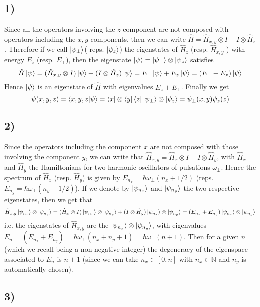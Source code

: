 \documentclass[10pt,a4paper]{book}
\begin{document}
\subsection*{1)}

Since all the operators involving the $z$-component are not composed with operators including the $x,y$-components, then we can write $\hat{H}=\hat{H}_{x,y}\otimes I+I\otimes\hat{H}_z$. Therefore if we call $\ket{\psi_{\perp}}$( reps. $\ket{\psi_z}$) the eigenstates of $\hat{H}_z$ (resp. $\hat{H}_{x,y}$ ) with energy $E_z$ (resp. $E_{\perp}$), then the eigenstate $\ket{\psi}=\ket{\psi_{\perp}}\otimes\ket{\psi_z}$ satisfies
$$\hat{H}\ket{\psi}=(\hat{H}_{x,y}\otimes I)\ket{\psi}+(I\otimes\hat{H}_z)\ket{\psi}=E_{\perp}\ket{\psi}+E_z\ket{\psi}=(E_{\perp}+E_{z})\ket{\psi}$$
Hence $\ket{\psi}$ is an eigenstate of $\hat{H}$ with eigenvalues $E_z+E_{\perp}$. 
Finally we get 
$$\psi(x,y,z)=\braket{x,y,z|\psi}=\bra{x}\otimes\bra{y}\bra{z}\ket{\psi_{\perp}}\otimes\ket{\psi_z}=\psi_{\perp}(x,y)\psi_z(z)$$

\subsection*{2)}
Since the operators including the component $x$ are not composed with those involving the component $y$, we can write that $\hat{H}_{x,y}=\hat{H}_x\otimes I+I\otimes\hat{H}_y$, with $\hat{H}_x$ and $\hat{H}_y$ the Hamiltonians for two harmonic oscillators of pulsations $\omega_{\perp}$. Hence the spectrum of $\hat{H}_x$ (resp. $\hat{H}_y$) is given by $E_{n_x}=\hbar \omega_{\perp}(n_x+1/2)$ (reps. $E_{n_y}=\hbar\omega_{\perp}(n_y+1/2)$). If we denote by $\ket{\psi_{n_x}}$ and $\ket{\psi_{n_y}}$ the two respective eigenstates, then we get that
$$\hat{H}_{x,y}\ket{\psi_{n_x}}\otimes\ket{\psi_{n_y}}=(\hat{H}_x\otimes I)\ket{\psi_{n_x}}\otimes\ket{\psi_{n_y}}+(I\otimes\hat{H}_y)\ket{\psi_{n_x}}\otimes\ket{\psi_{n_y}}=(E_{n_x}+E_{n_y})\ket{\psi_{n_x}}\otimes\ket{\psi_{n_y}}$$
i.e. the eigenstates of $\hat{H}_{x,y}$ are the $\ket{\psi_{n_x}}\otimes\ket{\psi_{n_y}}$, with eigenvalues $E_n=(E_{n_x}+E_{n_y})=\hbar\omega_{\perp}(n_x+n_y+1)=\hbar\omega_{\perp}(n+1)$. Then for a given $n$ (which we recall being a non-negative integer) the degeneracy of the eigenspace associated to $E_n$ is $n+1$ (since we can take $n_x\in [0,n]$ with $n_x\in\mathbb{N}$ and $n_y$ is automatically chosen).

\subsection*{3)}
\end{document}
